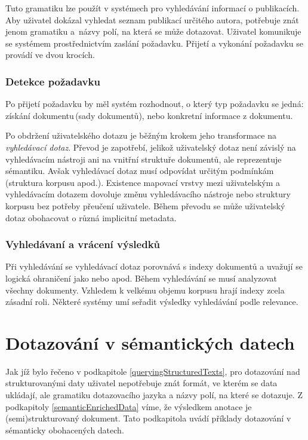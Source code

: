 Tuto gramatiku lze použít v systémech pro vyhledávání informací o publikacích. Aby uživatel dokázal vyhledat seznam publikací určitého autora, potřebuje znát jenom gramatiku a~názvy polí, na která se může dotazovat. Uživatel komunikuje se systémem prostřednictvím zaslání požadavku. Přijetí a vykonání požadavku se provádí ve dvou krocích.  

\subsubsection*{Detekce požadavku}
Po přijetí požadavku by měl systém rozhodnout, o který typ požadavku se jedná: získání  dokumentu\,(sady dokumentů), nebo konkretní informace z dokumentu. 

Po obdržení uživatelského dotazu je běžným krokem jeho transformace na \emph{vyhledávací dotaz}.  Převod je zapotřebí, jelikož uživatelský dotaz není závislý  na vyhledávacím nástroji ani na vnitřní struktuře dokumentů, ale reprezentuje  sémantiku. Avšak vyhledávací dotaz musí odpovídat určitým podmínkám\,(struktura korpusu apod.). Existence mapovací vrstvy mezi uživatelským a vyhledávacím dotazem dovoluje změnu vyhledávacího nástroje nebo struktury korpusu bez potřeby přeučení uživatele. Během převodu se může uživatelský dotaz obohacovat o různá implicitní metadata.


\subsubsection*{Vyhledávaní a vrácení výsledků}
Při vyhledávání se vyhledávací  dotaz porovnává s indexy dokumentů a uvažují se logická ohraničení jako  nebo  apod. Během vyhledávání se musí analyzovat všechny dokumenty. Vzhledem k velkému objemu korpusu  hrají indexy zcela zásadní roli. Některé systémy umí seřadit výsledky vyhledávání podle relevance.


\section{Dotazování v sémantických datech}

Jak jíž bylo řečeno v podkapitole \ref{queryingStructuredTexts}, pro dotazování nad strukturovanými daty uživatel nepotřebuje znát formát, ve kterém se data ukládají, ale gramatiku dotazovacího jazyka a názvy polí, na které se dotazuje. Z podkapitoly \ref{semanticEnrichedData} víme, že výsledkem anotace je (semi)strukturovaný dokument. Tato podkapitola uvádí příklady dotazování v sémanticky obohacených datech.

